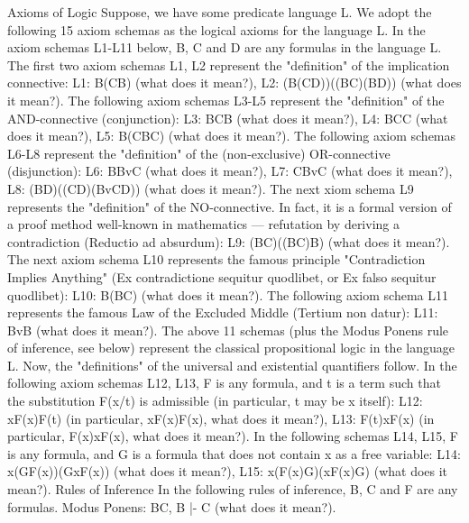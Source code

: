 Axioms of Logic
Suppose, we have some predicate language L. We adopt the following 15 axiom schemas as the logical
axioms for the language L.
In the axiom schemas L1-L11 below, B, C and D are any formulas in the language L.
The first two axiom schemas L1, L2 represent the "definition" of the implication connective:
L1: B\IMPLIES (C\IMPLIES B) (what does it mean?),
L2: (B\IMPLIES (C\IMPLIES D))\IMPLIES ((B\IMPLIES C)\IMPLIES (B\IMPLIES D)) (what does it mean?).
The following axiom schemas L3-L5 represent the "definition" of the AND-connective (conjunction):
L3: B\AND C\IMPLIES B (what does it mean?),
L4: B\AND C\IMPLIES C (what does it mean?),
L5: B\IMPLIES (C\IMPLIES B\AND C) (what does it mean?).
The following axiom schemas L6-L8 represent the "definition" of the (non-exclusive) OR-connective
(disjunction):
L6: B\IMPLIES BvC (what does it mean?),
L7: C\IMPLIES BvC (what does it mean?),
L8: (B\IMPLIES D)\IMPLIES ((C\IMPLIES D)\IMPLIES (BvC\IMPLIES D)) (what does it mean?).
The next xiom schema L9 represents the "definition" of the NO-connective. In fact, it is a formal version
of a proof method well-known in mathematics --- refutation by deriving a contradiction (Reductio ad
absurdum):
L9: (B\IMPLIES C)\IMPLIES ((B\IMPLIES \neg C)\IMPLIES \neg B) (what does it mean?).
The next axiom schema L10 represents the famous principle "Contradiction Implies Anything" (Ex
contradictione sequitur quodlibet, or Ex falso sequitur quodlibet):
L10: \neg B\IMPLIES (B\IMPLIES C) (what does it mean?).
The following axiom schema L11 represents the famous Law of the Excluded Middle (Tertium non
datur):
L11: Bv\neg B (what does it mean?).
The above 11 schemas (plus the Modus Ponens rule of inference, see below) represent the classical
propositional logic in the language L.
Now, the "definitions" of the universal and existential quantifiers follow.
In the following axiom schemas L12, L13, F is any formula, and t is a term such that the substitution F(x/t)
is admissible (in particular, t may be x itself):
L12: \forall xF(x)\IMPLIES F(t) (in particular, \forall xF(x)\IMPLIES F(x), what does it mean?),
L13: F(t)\IMPLIES \exists xF(x) (in particular, F(x)\IMPLIES \exists xF(x), what does it mean?).
In the following schemas L14, L15, F is any formula, and G is a formula that does not contain x as a free
variable:
L14: \forall x(G\IMPLIES F(x))\IMPLIES (G\IMPLIES \forall xF(x)) (what does it mean?),
L15: \forall x(F(x)\IMPLIES G)\IMPLIES (\exists xF(x)\IMPLIES G) (what does it mean?).
Rules of Inference
In the following rules of inference, B, C and F are any formulas.
Modus Ponens: B\IMPLIES C, B |- C (what does it mean?).
